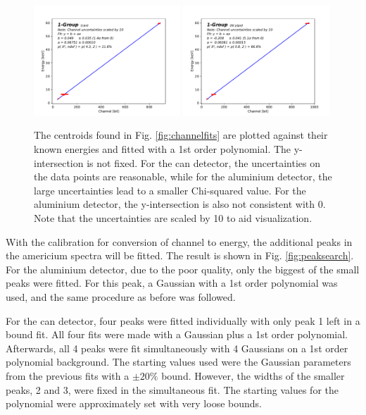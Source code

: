 \begin{figure}[htb!]
  \includegraphics[width=0.49\textwidth,page=1]{graphics/energychannelcalib.pdf}
  \includegraphics[width=0.49\textwidth,page=1]{graphics/aluenergychannelcalib.pdf}
  \caption{The centroids found in Fig. \ref{fig:channelfits} are plotted against their known energies and fitted with a 1st order polynomial. The y-intersection is not fixed. For the can detector, the uncertainties on the data points are reasonable, while for the aluminium detector, the large uncertainties lead to a smaller Chi-squared value. For the aluminium detector, the y-intersection is also not consistent with 0. Note that the uncertainties are scaled by 10 to aid visualization.}
  \label{fig:energychannelcalib}
\end{figure}

With the calibration for conversion of channel to energy, the additional peaks in the americium spectra will be fitted. The result is shown in Fig. \ref{fig:peaksearch}. For the aluminium detector, due to the poor quality, only the biggest of the small peaks were fitted. For this peak, a Gaussian with a 1st order polynomial was used, and the same procedure as before was followed.

For the can detector, four peaks were fitted individually with only peak 1 left in a bound fit. All four fits were made with a Gaussian plus a 1st order polynomial. Afterwards, all 4 peaks were fit simultaneously with 4 Gaussians on a 1st order polynomial background. The starting values used were the Gaussian parameters from the previous fits with a $\pm 20\%$ bound. However, the widths of the smaller peaks, 2 and 3, were fixed in the simultaneous fit. The starting values for the polynomial were approximately set with very loose bounds.

